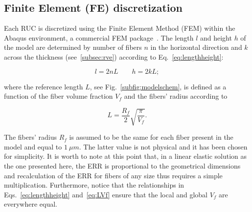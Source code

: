 \documentclass[review]{elsarticle}
\begin{document}
%

\subsection{Finite Element (FE) discretization}

Each RUC is discretized using the Finite Element Method (FEM) within the Abaqus environment, a commercial FEM package~\cite{abq12}. The length $l$ and height $h$ of the model are determined by number of fibers $n$ in the horizontal direction and $k$ across the thickness (see~\ref{subsec:rve}) according to Eq.~\ref{eq:lengthheight}:

\begin{equation}\label{eq:lengthheight}
l=2nL\qquad h=2kL;
\end{equation}

where the reference length $L$, see Fig.~\ref{subfig:modelschem}, is defined as a function of the fiber volume fraction $V_{f}$ and the fibers' radius according to

\begin{equation}\label{eq:LVf}
L=\frac{R_{f}}{2}\sqrt{\frac{\pi}{V_{f}}}.
\end{equation}

The fibers' radius $R_{f}$ is assumed to be the same for each fiber present in the model and equal to $1\ \mu m$. The latter value is not physical and it has been chosen for simplicity. It is worth to note at this point that, in a linear elastic solution as the one presented here, the ERR is proportional to the geometrical dimensions and recalculation of the ERR for fibers of any size thus requires a simple multiplication. Furthermore, notice that the relationships in Eqs.~\ref{eq:lengthheight} and~\ref{eq:LVf} ensure that the local and global $V_{f}$ are everywhere equal.
\end{document}
